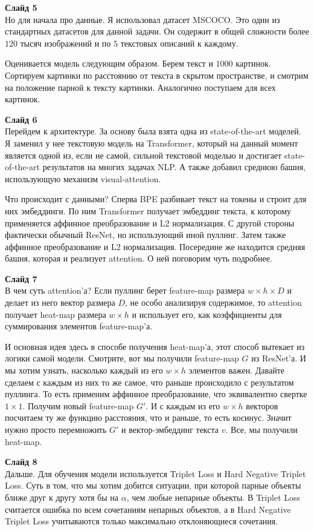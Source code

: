\documentclass[12pt]{article}
\begin{document}
	\textbf{Слайд 5}\\
	Но для начала про данные. Я использовал датасет MSCOCO. Это один из стандартных датасетов для данной задачи. Он содержит в общей сложности более $120$ тысяч изображений и по $5$ текстовых описаний к каждому.
	
	Оценивается модель следующим образом. Берем текст и $1000$ картинок. Сортируем картинки по расстоянию от текста в скрытом пространстве, и смотрим на положение парной к тексту картинки. Аналогично поступаем для всех картинок.
	
	\textbf{Слайд 6}\\
	Перейдем к архитектуре. За основу была взята одна из state-of-the-art моделей. Я заменил у нее текстовую модель на Transformer, который на данный момент является одной из, если не самой, сильной текстовой моделью и достигает state-of-the-art результатов на многих задачах NLP. А также добавил среднюю башня, использующую механизм visual-attention.
	
	Что происходит с данными? Сперва BPE разбивает текст на токены и строит для них эмбеддинги. По ним Transformer получает эмбеддинг текста, к которому применяется аффинное преобразование и L2 нормализация. С другой стороны фактически обычный ResNet, но использующий иной пуллинг. Затем также аффинное преобразование и L2 нормализация. Посередине же находится средняя башня, которая и реализует attention. О ней поговорим чуть подробнее.
	
	\textbf{Слайд 7}\\
	В чем суть attention'а? Если пуллинг берет feature-map размера $w \times h \times D$ и делает из него вектор размера $D$, не особо анализируя содержимое, то attention получает heat-map размера $w \times h$ и использует его, как коэффициенты для суммирования элементов feature-map'а.
	
	И основная идея здесь в способе получения heat-map'а, этот способ вытекает из логики самой модели. Смотрите, вот мы получили feature-map $G$ из ResNet'а. И мы хотим узнать, насколько каждый из его $w \times h$ элементов важен. Давайте сделаем с каждым из них то же самое, что раньше происходило с результатом пуллинга. То есть применим аффинное преобразование, что эквивалентно свертке $1 \times 1$. Получим новый feature-map $G'$. И с каждым из его $w \times h$ векторов посчитаем ту же функцию расстояния, что и раньше, то есть косинус. Значит нужно просто перемножить $G'$ и вектор-эмбеддинг текста $v$. Все, мы получили heat-map.
	
	\textbf{Слайд 8}\\
	Дальше. Для обучения модели используется Triplet Loss и Hard Negative Triplet Loss. Суть в том, что мы хотим добится ситуации, при которой парные объекты ближе друг к другу хотя бы на $\alpha$, чем любые непарные объекты. В Triplet Loss считается ошибка по всем сочетаниям непарных объектов, а в Hard Negative Triplet Loss учитываются только максимально отклоняющиеся сочетания.
	
\end{document}
